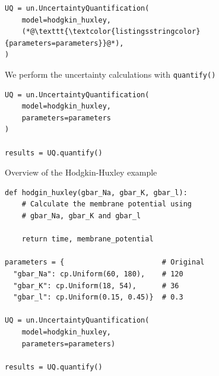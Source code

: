 \documentclass[presentation]{beamer}
\begin{document}
\begin{frame}[fragile]

\begin{lstlisting}
UQ = un.UncertaintyQuantification(
    model=hodgkin_huxley,
    (*@\texttt{\textcolor{listingsstringcolor}{parameters=parameters}}@*),
)
  \end{lstlisting}
\end{frame}


\begin{frame}[fragile]{We perform the uncertainty calculations with \lstinline|quantify()|}

\begin{lstlisting}
UQ = un.UncertaintyQuantification(
    model=hodgkin_huxley,
    parameters=parameters
)

results = UQ.quantify()
\end{lstlisting}

\end{frame}








\begin{frame}[fragile]{Overview of the Hodgkin-Huxley example}
\vspace{-3mm}

\begin{lstlisting}
def hodgin_huxley(gbar_Na, gbar_K, gbar_l):
    # Calculate the membrane potential using
    # gbar_Na, gbar_K and gbar_l

    return time, membrane_potential

parameters = {                       # Original
  "gbar_Na": cp.Uniform(60, 180),    # 120
  "gbar_K": cp.Uniform(18, 54),      # 36
  "gbar_l": cp.Uniform(0.15, 0.45)}  # 0.3

UQ = un.UncertaintyQuantification(
    model=hodgkin_huxley,
    parameters=parameters)

results = UQ.quantify()
\end{lstlisting}

\end{frame}


\end{document}
